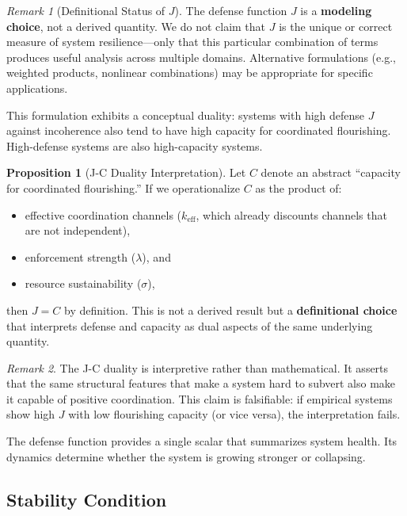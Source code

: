 \documentclass[11pt,a4paper]{article}
\theoremstyle{definition}
\newtheorem{proposition}[theorem]{Proposition}
\theoremstyle{remark}
\newtheorem{remark}{Remark}[section]
\newcommand{\keff}{k_{\text{eff}}}
\begin{document}
\begin{remark}[Definitional Status of $J$]
The defense function $J$ is a \textbf{modeling choice}, not a derived quantity. We do not claim that $J$ is the unique or correct measure of system resilience---only that this particular combination of terms produces useful analysis across multiple domains. Alternative formulations (e.g., weighted products, nonlinear combinations) may be appropriate for specific applications.
\end{remark}

This formulation exhibits a conceptual duality: systems with high defense $J$ against incoherence also tend to have high capacity for coordinated flourishing. High-defense systems are also high-capacity systems.

\begin{proposition}[J-C Duality Interpretation]
Let $C$ denote an abstract ``capacity for coordinated flourishing.'' If we operationalize $C$ as the product of:
\begin{itemize}[noitemsep]
    \item effective coordination channels ($\keff$, which already discounts channels that are not independent),
    \item enforcement strength ($\lambda$), and
    \item resource sustainability ($\sigma$),
\end{itemize}
then $J = C$ by definition. This is not a derived result but a \textbf{definitional choice} that interprets defense and capacity as dual aspects of the same underlying quantity.
\end{proposition}

\begin{remark}
The J-C duality is interpretive rather than mathematical. It asserts that the same structural features that make a system hard to subvert also make it capable of positive coordination. This claim is falsifiable: if empirical systems show high $J$ with low flourishing capacity (or vice versa), the interpretation fails.
\end{remark}

The defense function provides a single scalar that summarizes system health. Its dynamics determine whether the system is growing stronger or collapsing.

\subsection{Stability Condition}
\end{document}
